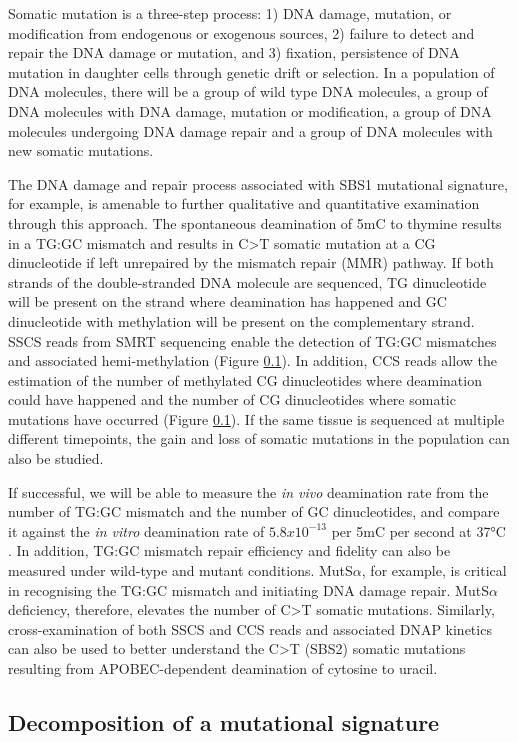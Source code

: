 Somatic mutation is a three-step process: 1) DNA damage, mutation, or modification from endogenous or exogenous sources, 2) failure to detect and repair the DNA damage or mutation, and 3) fixation, persistence of DNA mutation in daughter cells through genetic drift or selection. In a population of DNA molecules, there will be a group of wild type DNA molecules, a group of DNA molecules with DNA damage, mutation or modification, a group of DNA molecules undergoing DNA damage repair and a group of DNA molecules with new somatic mutations. 

The DNA damage and repair process associated with SBS1 mutational signature, for example, is amenable to further qualitative and quantitative examination through this approach. The spontaneous deamination of 5mC to thymine results in a TG:GC mismatch and results in C>T somatic mutation at a CG dinucleotide if left unrepaired by the mismatch repair (MMR) pathway. If both strands of the double-stranded DNA molecule are sequenced, TG dinucleotide will be present on the strand where deamination has happened and GC dinucleotide with methylation will be present on the complementary strand. SSCS reads from SMRT sequencing enable the detection of TG:GC mismatches and associated hemi-methylation (Figure \ref{}). In addition, CCS reads allow the estimation of the number of methylated CG dinucleotides where deamination could have happened and the number of CG dinucleotides where somatic mutations have occurred (Figure \ref{}). If the same tissue is sequenced at multiple different timepoints, the gain and loss of somatic mutations in the population can also be studied.

If successful, we will be able to measure the \textit{in vivo} deamination rate from the number of TG:GC mismatch and the number of GC dinucleotides, and compare it against the \textit{in vitro} deamination rate of $5.8x10^{-13}$ per 5mC per second at 37°C \cite{}. In addition, TG:GC mismatch repair efficiency and fidelity can also be measured under wild-type and mutant conditions. MutS$\alpha$, for example, is critical in recognising the TG:GC mismatch and initiating DNA damage repair. MutS$\alpha$ deficiency, therefore, elevates the number of C>T somatic mutations. Similarly, cross-examination of both SSCS and CCS reads and associated DNAP kinetics can also be used to better understand the C>T (SBS2) somatic mutations resulting from APOBEC-dependent deamination of cytosine to uracil.  

\subsection{Decomposition of a mutational signature}

